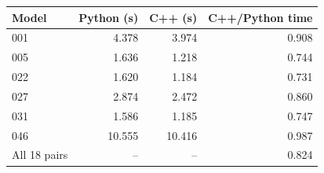 \begin{tabular}{lrrr}
\toprule
Model & Python (s) & C++ (s) & C++/Python time\\
\midrule
001 & 4.378 & 3.974 & 0.908\\
005 & 1.636 & 1.218 & 0.744\\
022 & 1.620 & 1.184 & 0.731\\
027 & 2.874 & 2.472 & 0.860\\
031 & 1.586 & 1.185 & 0.747\\
046 & 10.555 & 10.416 & 0.987\\
All 18 pairs & -- & -- & 0.824\\
\bottomrule
\end{tabular}
